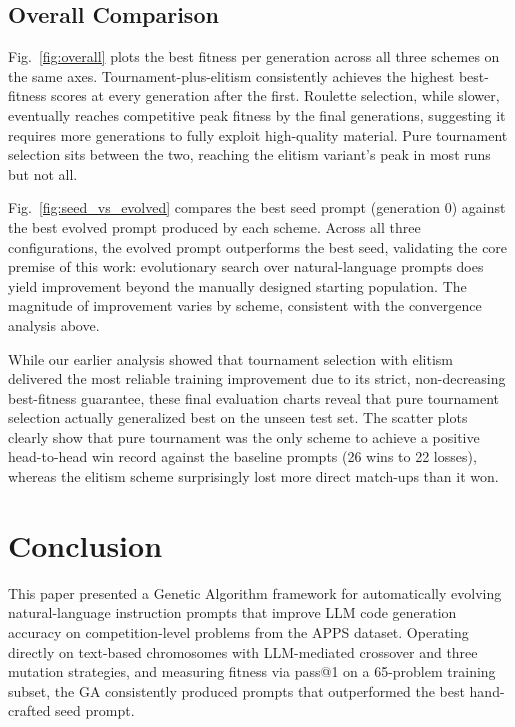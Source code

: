 \documentclass[conference]{IEEEtran}
\begin{document}
\subsection{Overall Comparison}

Fig.~\ref{fig:overall} plots the best fitness per generation across all three schemes on
the same axes. Tournament-plus-elitism consistently achieves the highest best-fitness
scores at every generation after the first. Roulette selection, while slower, eventually
reaches competitive peak fitness by the final generations, suggesting it requires more
generations to fully exploit high-quality material. Pure tournament selection sits between
the two, reaching the elitism variant's peak in most runs but not all.

Fig.~\ref{fig:seed_vs_evolved} compares the best seed prompt (generation 0) against the
best evolved prompt produced by each scheme. Across all three configurations, the evolved
prompt outperforms the best seed, validating the core premise of this work: evolutionary
search over natural-language prompts does yield improvement beyond the manually designed
starting population. The magnitude of improvement varies by scheme, consistent with the
convergence analysis above.

While our earlier analysis showed that tournament selection with elitism delivered the most reliable training improvement due to its strict, non-decreasing best-fitness guarantee, these final evaluation charts reveal that pure tournament selection actually generalized best on the unseen test set. The scatter plots clearly show that pure tournament was the only scheme to achieve a positive head-to-head win record against the baseline prompts (26 wins to 22 losses), whereas the elitism scheme surprisingly lost more direct match-ups than it won.

\section{Conclusion}
\label{sec:conclusion}

This paper presented a Genetic Algorithm framework for automatically evolving natural-language
instruction prompts that improve LLM code generation accuracy on competition-level
problems from the APPS dataset. Operating directly on text-based chromosomes with
LLM-mediated crossover and three mutation strategies, and measuring fitness via pass@1 on a
65-problem training subset, the GA consistently produced prompts that outperformed the best
hand-crafted seed prompt.
\end{document}
